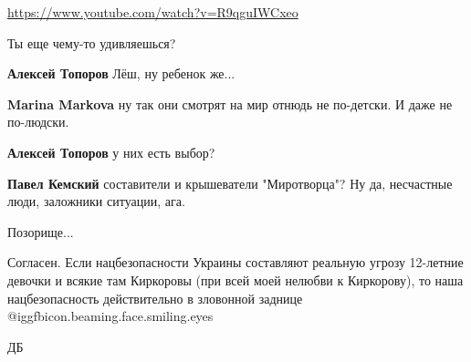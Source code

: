 \begin{itemize}
\begin{itemize}
\url{https://www.youtube.com/watch?v=R9qguIWCxeo}

\end{itemize} %

Ты еще чему-то удивляешься?

\begin{itemize} %
\textbf{Алексей Топоров} Лёш, ну ребенок же...

\textbf{Marina Markova} ну так они смотрят на мир отнюдь не по-детски. И даже не по-людски.

\textbf{Алексей Топоров} у них есть выбор?

\textbf{Павел Кемский} составители и крышеватели "Миротворца"? Ну да, несчастные люди, заложники ситуации, ага.
\end{itemize} %

Позорище...


Согласен. Если нацбезопасности Украины составляют реальную угрозу 12-летние
девочки и всякие там Киркоровы (при всей моей нелюбви к Киркорову), то наша
нацбезопасность действительно в зловонной заднице  @igg{fbicon.beaming.face.smiling.eyes} 


ДБ

\end{itemize} %
